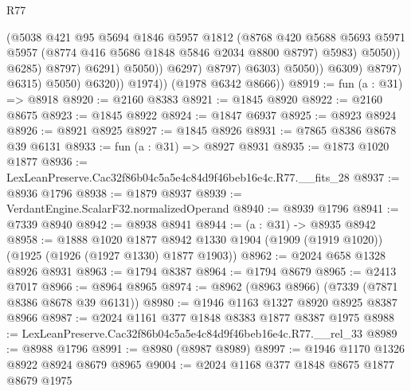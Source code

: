 \begin{lexlean}{R77}
\begin{coremodule}
                                            (@5038
                                              @421
                                              @95
                                              @5694
                                              @1846
                                              @5957
                                              @1812
                                              (@8768
                                                @420
                                                @5688
                                                @5693
                                                @5971
                                                @5957
                                                (@8774 @416 @5686 @1848 @5846 @2034 @8800 @8797)
                                                @5983)
                                              @5050))
                                          @6285)
                                        @8797)
                                      @6291)
                                    @5050))
                                @6297)
                              @8797)
                            @6303)
                          @5050))
                      @6309)
                    @8797)
                  @6315)
                @5050)
              @6320))
          @1974))
      (@1978 @6342 @8666))
@8919 := fun (a : @31) => @8918
@8920 := @2160 @8383
@8921 := @1845 @8920
@8922 := @2160 @8675
@8923 := @1845 @8922
@8924 := @1847 @6937
@8925 := @8923 @8924
@8926 := @8921 @8925
@8927 := @1845 @8926
@8931 := @7865 @8386 @8678 @39 @6131
@8933 := fun (a : @31) => @8927 @8931
@8935 := @1873 @1020 @1877
@8936 := LexLeanPreserve.Cac32f86b04c5a5e4c84d9f46beb16e4c.R77.__fits_28
@8937 := @8936 @1796
@8938 := @1879 @8937
@8939 := VerdantEngine.ScalarF32.normalizedOperand
@8940 := @8939 @1796
@8941 := @7339 @8940
@8942 := @8938 @8941
@8944 := (a : @31) -> @8935 @8942
@8958 := @1888
    @1020
    @1877
    @8942
    @1330
    @1904
    (@1909 (@1919 @1020))
    (@1925 (@1926 (@1927 @1330) @1877 @1903))
@8962 := @2024 @658 @1328 @8926 @8931
@8963 := @1794 @8387
@8964 := @1794 @8679
@8965 := @2413 @7017
@8966 := @8964 @8965
@8974 := @8962 (@8963 @8966) (@7339 (@7871 @8386 @8678 @39 @6131))
@8980 := @1946 @1163 @1327 @8920 @8925 @8387 @8966
@8987 := @2024 @1161 @377 @1848 @8383 @1877 @8387 @1975
@8988 := LexLeanPreserve.Cac32f86b04c5a5e4c84d9f46beb16e4c.R77.__rel_33
@8989 := @8988 @1796
@8991 := @8980 (@8987 @8989)
@8997 := @1946 @1170 @1326 @8922 @8924 @8679 @8965
@9004 := @2024 @1168 @377 @1848 @8675 @1877 @8679 @1975

\end{coremodule}
\end{lexlean}
